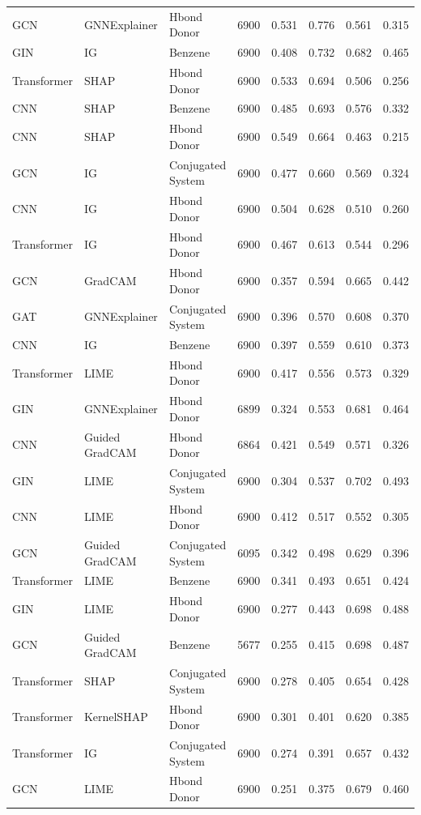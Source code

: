 \begin{table}
\begin{tabular}{lllrllll}
GCN & GNNExplainer & Hbond Donor & 6900 & 0.531 & 0.776 & 0.561 & 0.315 \\
GIN & IG & Benzene & 6900 & 0.408 & 0.732 & 0.682 & 0.465 \\
Transformer & SHAP & Hbond Donor & 6900 & 0.533 & 0.694 & 0.506 & 0.256 \\
CNN & SHAP & Benzene & 6900 & 0.485 & 0.693 & 0.576 & 0.332 \\
CNN & SHAP & Hbond Donor & 6900 & 0.549 & 0.664 & 0.463 & 0.215 \\
GCN & IG & Conjugated System & 6900 & 0.477 & 0.660 & 0.569 & 0.324 \\
CNN & IG & Hbond Donor & 6900 & 0.504 & 0.628 & 0.510 & 0.260 \\
Transformer & IG & Hbond Donor & 6900 & 0.467 & 0.613 & 0.544 & 0.296 \\
GCN & GradCAM & Hbond Donor & 6900 & 0.357 & 0.594 & 0.665 & 0.442 \\
GAT & GNNExplainer & Conjugated System & 6900 & 0.396 & 0.570 & 0.608 & 0.370 \\
CNN & IG & Benzene & 6900 & 0.397 & 0.559 & 0.610 & 0.373 \\
Transformer & LIME & Hbond Donor & 6900 & 0.417 & 0.556 & 0.573 & 0.329 \\
GIN & GNNExplainer & Hbond Donor & 6899 & 0.324 & 0.553 & 0.681 & 0.464 \\
CNN & Guided GradCAM & Hbond Donor & 6864 & 0.421 & 0.549 & 0.571 & 0.326 \\
GIN & LIME & Conjugated System & 6900 & 0.304 & 0.537 & 0.702 & 0.493 \\
CNN & LIME & Hbond Donor & 6900 & 0.412 & 0.517 & 0.552 & 0.305 \\
GCN & Guided GradCAM & Conjugated System & 6095 & 0.342 & 0.498 & 0.629 & 0.396 \\
Transformer & LIME & Benzene & 6900 & 0.341 & 0.493 & 0.651 & 0.424 \\
GIN & LIME & Hbond Donor & 6900 & 0.277 & 0.443 & 0.698 & 0.488 \\
GCN & Guided GradCAM & Benzene & 5677 & 0.255 & 0.415 & 0.698 & 0.487 \\
Transformer & SHAP & Conjugated System & 6900 & 0.278 & 0.405 & 0.654 & 0.428 \\
Transformer & KernelSHAP & Hbond Donor & 6900 & 0.301 & 0.401 & 0.620 & 0.385 \\
Transformer & IG & Conjugated System & 6900 & 0.274 & 0.391 & 0.657 & 0.432 \\
GCN & LIME & Hbond Donor & 6900 & 0.251 & 0.375 & 0.679 & 0.460 \\

\end{tabular}
\end{table}
